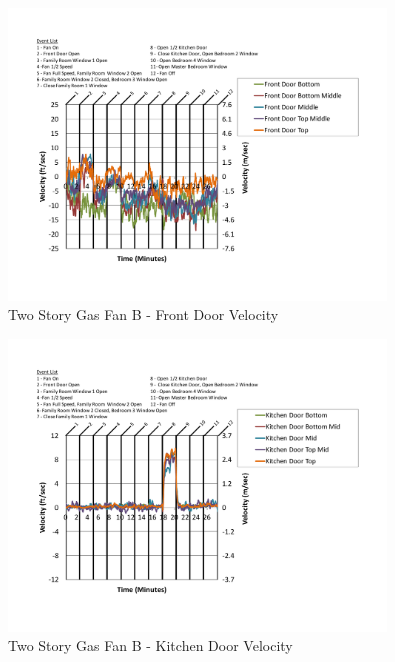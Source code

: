 \documentclass{article}
\begin{document}
\begin{appendices}
	\begin{figure}[H]
		\centering
		\includegraphics[height=3.05in,trim=0.67in 1.1in 0.67in 0.8in,clip=true]{0_Images/Results_Charts/ColdFlow/Two_Story/Gas/B/Front_Door_Velocity.pdf}
		\caption{Two Story Gas Fan B - Front Door Velocity}
	\end{figure}
 

	\begin{figure}[H]
		\centering
		\includegraphics[height=3.05in,trim=0.67in 1.1in 0.67in 0.8in,clip=true]{0_Images/Results_Charts/ColdFlow/Two_Story/Gas/B/Kitchen_Door_Velocity.pdf}
		\caption{Two Story Gas Fan B - Kitchen Door Velocity}
	\end{figure}
 
	\clearpage


\end{appendices}
\end{document}
